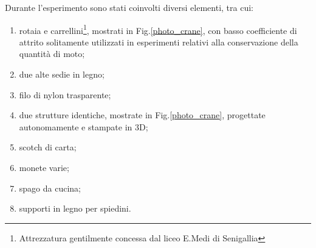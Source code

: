 \documentclass[11pt, a4paper, twoside]{article}
\begin{document}
Durante l'esperimento sono stati coinvolti diversi elementi, tra cui:
\begin{enumerate}
      \item rotaia e carrellini\footnote{Attrezzatura gentilmente concessa dal liceo E.Medi di Senigallia}, mostrati in Fig.\ref{photo_crane}, con basso coefficiente di attrito solitamente
      utilizzati in esperimenti relativi alla conservazione della quantità
      di moto;
      \item due alte sedie in legno;
      \item filo di nylon trasparente;
      \item due strutture identiche, mostrate in Fig.\ref{photo_crane}, progettate autonomamente e stampate in 3D;
      \item scotch di carta;
      \item monete varie;
      \item spago da cucina;
      \item supporti in legno per spiedini.
\end{enumerate}
\end{document}
